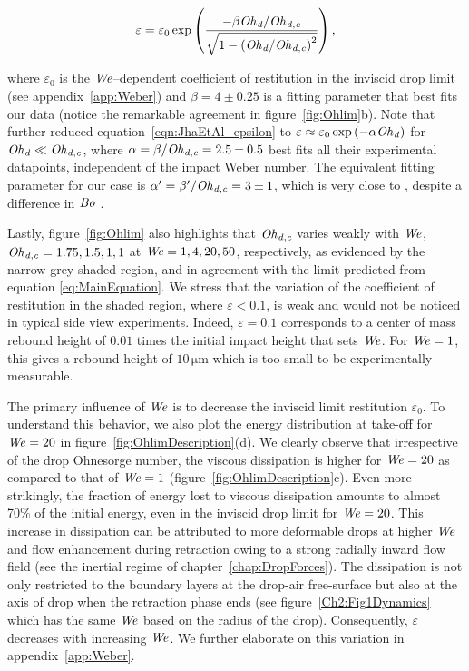 \begin{align}
	\label{eqn:JhaEtAl_epsilon}
	\varepsilon = \varepsilon_0\exp\left( \frac{-\beta \mathit{Oh}_\mathit{d}/\mathit{Oh}_\mathit{d,c}}{\sqrt{1 - \left(\mathit{Oh}_\mathit{d}/\mathit{Oh}_\mathit{d,c}\right)^{2}}} \right),
\end{align}

\noindent where $\varepsilon_0$ is the $\mathit{We}$--dependent coefficient of restitution in the inviscid drop limit (see appendix~\ref{app:Weber}) and $\beta = 4 \pm 0.25$ is a fitting parameter that best fits our data (notice the remarkable agreement in figure~\ref{fig:Ohlim}b). Note that \citet{jha2020viscous} further reduced equation~\eqref{eqn:JhaEtAl_epsilon} to $\varepsilon \approx \varepsilon_0\exp\left(-\alpha\mathit{Oh}_\mathit{d}\right)$ for $\mathit{Oh}_\mathit{d} \ll \mathit{Oh}_\mathit{d,c}$, where $\alpha = \beta/\mathit{Oh}_\mathit{d,c} = 2.5 \pm 0.5$ best fits all their experimental datapoints, independent of the impact Weber number. The equivalent fitting parameter for our case is $\alpha^{\prime} = \beta^{\prime}/\mathit{Oh}_\mathit{d,c} = 3 \pm 1$, which is very close to \citet{jha2020viscous}, despite a difference in $\mathit{Bo}$ \citep[$0$ here vs. $0.167$ for][also see \S~\ref{sec:LimitingCases:Bo}, and appendix~\ref{app:Weber}]{jha2020viscous}. 

Lastly, figure~\ref{fig:Ohlim} also highlights that $\mathit{Oh}_\mathit{d,c}$ varies weakly with $\mathit{We}$, $\mathit{Oh}_\mathit{d,c} = 1.75, 1.5, 1, 1$ at $\mathit{We} = 1, 4, 20, 50$, respectively, as evidenced by the narrow grey shaded region, and in agreement with the limit predicted from equation \eqref{eq:MainEquation}. We stress that the variation of the coefficient of restitution in the shaded region, where $\varepsilon<0.1$, is weak and would not be noticed in typical side view experiments. Indeed, $\varepsilon = 0.1$ corresponds to a center of mass rebound height of $0.01$ times the initial impact height that sets $\mathit{We}$. For $\mathit{We} = 1$, this gives a rebound height of $10\,\si{\micro\meter}$ which is too small to be experimentally measurable. 

The primary influence of $\mathit{We}$ is to decrease the inviscid limit restitution $\varepsilon_0$. To understand this behavior, we also plot the energy distribution at take-off for $\mathit{We} = 20$ in figure~\ref{fig:OhlimDescription}(d). We clearly observe that irrespective of the drop Ohnesorge number, the viscous dissipation is higher for $\mathit{We} = 20$ as compared to that of $\mathit{We} = 1$ (figure~\ref{fig:OhlimDescription}c). Even more strikingly, the fraction of energy lost to viscous dissipation amounts to almost 70\% of the initial energy, even in the inviscid drop limit for $\mathit{We} = 20$. This increase in dissipation can be attributed to more deformable drops at higher $\mathit{We}$ and flow enhancement during retraction owing to a strong radially inward flow field (see the inertial regime of chapter~\ref{chap:DropForces}). The dissipation is not only restricted to the boundary layers at the drop-air free-surface but also at the axis of drop when the retraction phase ends (see figure~\ref{Ch2:Fig1Dynamics} which has the same $\mathit{We}$ based on the radius of the drop). Consequently, $\varepsilon$ decreases with increasing $\mathit{We}$. We further elaborate on this variation in appendix~\ref{app:Weber}.


